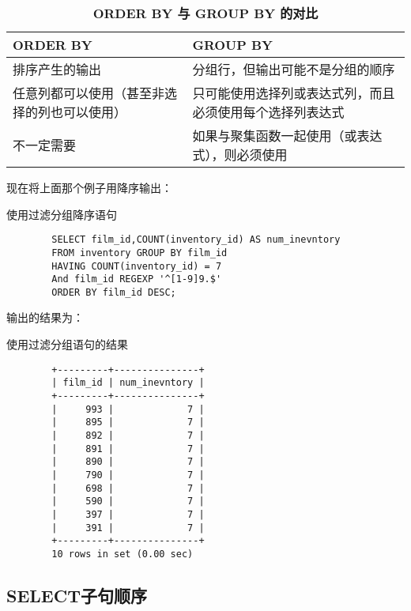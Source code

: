 \documentclass[UTF8]{article}
\begin{document}
\begin{table}[H]
        \caption{ \textbf{ORDER BY 与 GROUP BY 的对比}}
        \centering
        \begin{tabular}{p{4cm}p{4cm}}
            \toprule
            \textbf{ORDER BY} & \textbf{GROUP BY} \\ 
            \midrule
            排序产生的输出 & 分组行，但输出可能不是分组的顺序 \\ 
            任意列都可以使用（甚至非选择的列也可以使用） & 只可能使用选择列或表达式列，而且必须使用每个选择列表达式 \\ 
            不一定需要 & 如果与聚集函数一起使用（或表达式），则必须使用 \\ 
            \bottomrule
        \end{tabular}
\end{table}
     
现在将上面那个例子用降序输出：

\begin{listing}[H]
	\caption{使用过滤分组降序语句}
	\label{code:usehavingdescclause}
\begin{verbatim}
        SELECT film_id,COUNT(inventory_id) AS num_inevntory 
        FROM inventory GROUP BY film_id 
        HAVING COUNT(inventory_id) = 7 
        And film_id REGEXP '^[1-9]9.$'
        ORDER BY film_id DESC;
\end{verbatim}
\end{listing}

输出的结果为：

\begin{listing}[H]
	\caption{使用过滤分组语句的结果}
	\label{code:usehavingdescclauseresult}
\begin{verbatim}
        +---------+---------------+
        | film_id | num_inevntory |
        +---------+---------------+
        |     993 |             7 |
        |     895 |             7 |
        |     892 |             7 |
        |     891 |             7 |
        |     890 |             7 |
        |     790 |             7 |
        |     698 |             7 |
        |     590 |             7 |
        |     397 |             7 |
        |     391 |             7 |
        +---------+---------------+
        10 rows in set (0.00 sec)
\end{verbatim}
\end{listing}

\subsection{SELECT子句顺序}
\end{document}
